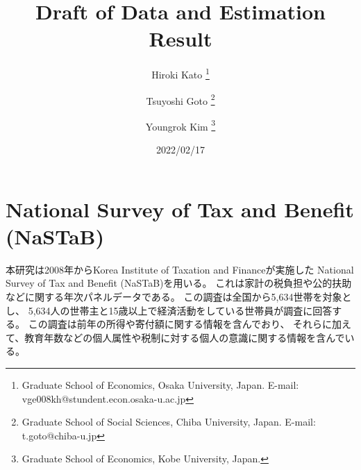 \documentclass[
  11pt,
  a4paper,
]{article}
\title{Draft of Data and Estimation Result  }
\author{
    Hiroki Kato
  \thanks{Graduate School of Economics, Osaka University, Japan. E-mail: vge008kh@stundent.econ.osaka-u.ac.jp  }
  \and
    Tsuyoshi Goto
  \thanks{Graduate School of Social Sciences, Chiba University, Japan. E-mail: t.goto@chiba-u.jp  }
  \and
    Youngrok Kim
  \thanks{Graduate School of Economics, Kobe University, Japan.  }
  \and
  }
\date{2022/02/17}
\begin{document}
\begin{spacing}{1}
  \maketitle
\end{spacing}

\hypertarget{nastab}{%
\section{National Survey of Tax and Benefit (NaSTaB)}\label{nastab}}

本研究は2008年からKorea Institute of Taxation and Financeが実施した
National Survey of Tax and Benefit (NaSTaB)を用いる。
これは家計の税負担や公的扶助などに関する年次パネルデータである。
この調査は全国から5,634世帯を対象とし、
5,634人の世帯主と15歳以上で経済活動をしている世帯員が調査に回答する。
この調査は前年の所得や寄付額に関する情報を含んでおり、
それらに加えて、教育年数などの個人属性や税制に対する個人の意識に関する情報を含んでいる。
\end{document}

